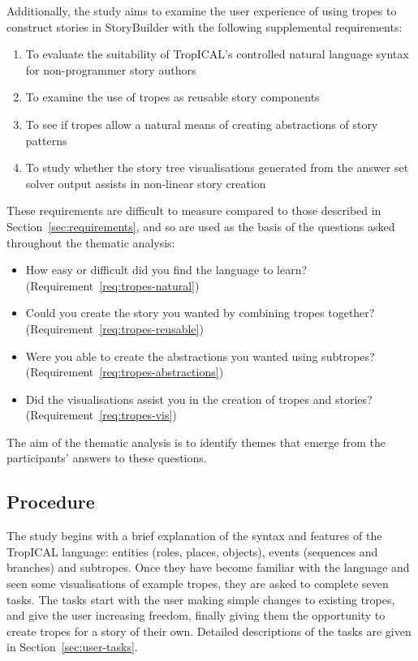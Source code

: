 \documentclass[11pt]{report}
\begin{document}
Additionally, the study aims to examine the user experience of using tropes to
construct stories in StoryBuilder with the following supplemental requirements:

\begin{enumerate}[S1.]
  \item\label{req:tropes-natural} To evaluate the suitability of TropICAL's controlled natural language
    syntax for non-programmer story authors
  \item\label{req:tropes-reusable} To examine the use of tropes as reusable story components
  \item\label{req:tropes-abstractions} To see if tropes allow a natural means of creating abstractions of story patterns
  \item\label{req:tropes-vis} To study whether the story tree visualisations
    generated from the answer set solver output assists in non-linear story creation
\end{enumerate}

These requirements are difficult to measure compared to those described in
Section~\ref{sec:requirements}, and so are used as the basis of the questions
asked throughout the thematic analysis:

\begin{itemize}
  \item How easy or difficult did you find the language to learn? (Requirement~\ref{req:tropes-natural})
  \item Could you create the story you wanted by combining tropes together? (Requirement~\ref{req:tropes-reusable})
  \item Were you able to create the abstractions you wanted using subtropes? (Requirement~\ref{req:tropes-abstractions})
  \item Did the visualisations assist you in the creation of tropes and stories? (Requirement~\ref{req:tropes-vis})
\end{itemize}

The aim of the thematic analysis is to identify themes that emerge from the participants' answers to these questions.

\subsection{Procedure}

The study begins with a brief explanation of the syntax and features of the
TropICAL language: entities (roles, places, objects), events (sequences and
branches) and subtropes. Once they have become familiar with the language and
seen some visualisations of example tropes, they are asked to complete seven
tasks. The tasks start with the user making simple changes to existing tropes,
and give the user increasing freedom, finally giving them the opportunity to
create tropes for a story of their own. Detailed descriptions of the tasks are
given in Section~\ref{sec:user-tasks}.
\end{document}
